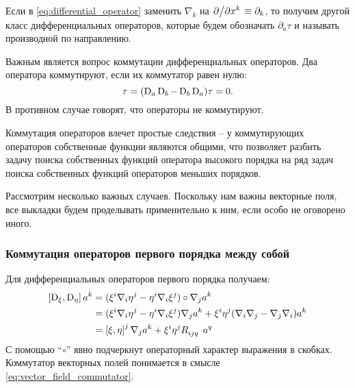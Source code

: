 \documentclass[12pt,a4paper]{article}
\begin{document}
            Если в \autoref{eq:differential_operator} заменить $\nabla_k$ на $\pdv*{x^k} \equiv \partial_k$, то получим другой класс дифференциальных операторов, которые будем обозначать $\partial_a\tau$ и называть производной по направлению.

            Важным является вопрос коммутации дифференциальных операторов. Два оператора коммутируют, если их коммутатор равен нулю:
            \begin{equation}
                [\D_a, \D_b]\tau = (\D_a \D_b - \D_b \D_a) \tau = 0 .
            \end{equation}
            В противном случае говорят, что операторы не коммутируют.

            Коммутация операторов влечет простые следствия -- у коммутирующих операторов собственные функции являются общими, что позволяет разбить задачу поиска собственных функций оператора высокого порядка на ряд задач поиска собственных функций операторов меньших порядков.

            Рассмотрим несколько важных случаев. Поскольку нам важны векторные поля, все выкладки будем проделывать применительно к ним, если особо не оговорено иного.


            \subsubsection{Коммутация операторов первого порядка между собой}

                Для дифференциальных операторов первого порядка получаем:
                \begin{equation}\begin{aligned}
                    \left[ \operatorname{D}_\xi, \operatorname{D}_\eta \right] a^k
                        &= (\xi^i \nabla_i \eta^j - \eta^i \nabla_i \xi^j) \circ \nabla_j a^k \\
                        &= (\xi^i \nabla_i \eta^j - \eta^i \nabla_i \xi^j) \nabla_j a^k
                            + \xi^i \eta^j (\nabla_i \nabla_j - \nabla_j \nabla_i) a^k \\
                        &= \left[ \xi, \eta \right]^j \nabla_j a^k
                            + \xi^i \eta^j R_{ijq}^{\hphantom{ijqk}} a^q
                \end{aligned}\end{equation}
                С помощью \enquote{$\circ$} явно подчеркнут операторный характер выражения в скобках. Коммутатор векторных полей понимается в смысле \autoref{eq:vector_field_commutator}.
\end{document}
